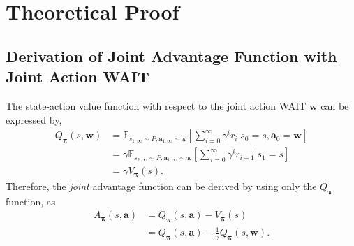 \documentclass[11pt]{article}
\theoremstyle{plain}
\theoremstyle{remark}
\begin{document}

% 

\clearpage
\appendix
\onecolumn
\section{Theoretical Proof}
\label{appendix:a}
\subsection{Derivation of Joint Advantage Function with Joint Action WAIT}\label{app:wait_action_derivation}
The state-action value function with respect to the joint action WAIT $\boldsymbol{w}$ can be expressed by, 
\begin{equation}\nonumber
\begin{split}
Q_{\boldsymbol{\pi}}(s, \boldsymbol{w}) &=\mathbb{E}_{s_{1:\infty} \sim P, \boldsymbol{a}_{1:\infty}\sim \boldsymbol{\pi}}\left[\sum\nolimits_{i=0}^{\infty}\gamma^{i}r_i \big| s_0=s, \boldsymbol{a}_0=\boldsymbol{w}\right]\\
    &=\gamma\mathbb{E}_{s_{2:\infty} \sim P, \boldsymbol{a}_{1:\infty}\sim \boldsymbol{\pi}}\left[\sum\nolimits_{i=0}^{\infty}\gamma^{i}r_{i+1} \big| s_1=s\right]\\
    &=\gamma V_{\boldsymbol{\pi}}(s).
\end{split}
\end{equation}
Therefore, the \emph{joint} advantage function can be derived by using only the $Q_{\boldsymbol{\pi}}$ function, as
\begin{align*}
A_{\boldsymbol{\pi}}(s, \boldsymbol{a})&=Q_{\boldsymbol{\pi}}(s, \boldsymbol{a}) - V_{\boldsymbol{\pi}}(s)\\
&=Q_{\boldsymbol{\pi}}(s, \boldsymbol{a}) - \frac{1}{\gamma}Q_{\boldsymbol{\pi}}(s, \boldsymbol{w}).
\end{align*}
\end{document}

